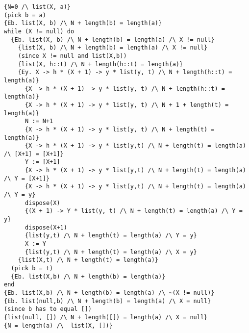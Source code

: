 \begin{enumerate}[label=(\alph*)]
\begin{verbatim}
{N=0 /\ list(X, a)}
(pick b = a)
{Eb. list(X, b) /\ N + length(b) = length(a)}
while (X != null) do
  {Eb. list(X, b) /\ N + length(b) = length(a) /\ X != null}
    {list(X, b) /\ N + length(b) = length(a) /\ X != null}
    (since X != null and list(X,b))
    {list(X, h::t) /\ N + length(h::t) = length(a)}
    {Ey. X -> h * (X + 1) -> y * list(y, t) /\ N + length(h::t) = length(a)}
      {X -> h * (X + 1) -> y * list(y, t) /\ N + length(h::t) = length(a)}
      {X -> h * (X + 1) -> y * list(y, t) /\ N + 1 + length(t) = length(a)}
      N := N+1
      {X -> h * (X + 1) -> y * list(y, t) /\ N + length(t) = length(a)}
      {X -> h * (X + 1) -> y * list(y,t) /\ N + length(t) = length(a) /\ [X+1] = [X+1]}
      Y := [X+1]
      {X -> h * (X + 1) -> y * list(y,t) /\ N + length(t) = length(a) /\ Y = [X+1]}
      {X -> h * (X + 1) -> y * list(y,t) /\ N + length(t) = length(a) /\ Y = y}
      dispose(X)
      {(X + 1) -> Y * list(y, t) /\ N + length(t) = length(a) /\ Y = y}
      dispose(X+1)
      {list(y,t) /\ N + length(t) = length(a) /\ Y = y}
      X := Y
      {list(y,t) /\ N + length(t) = length(a) /\ X = y}
    {list(X,t) /\ N + length(t) = length(a)}
  (pick b = t)
  {Eb. list(X,b) /\ N + length(b) = length(a)}
end
{Eb. list(X,b) /\ N + length(b) = length(a) /\ ~(X != null)}
{Eb. list(null,b) /\ N + length(b) = length(a) /\ X = null}
(since b has to equal [])
{list(null, []) /\ N + length([]) = length(a) /\ X = null}
{N = length(a) /\  list(X, [])}




\end{verbatim}







        
    \end{enumerate}


